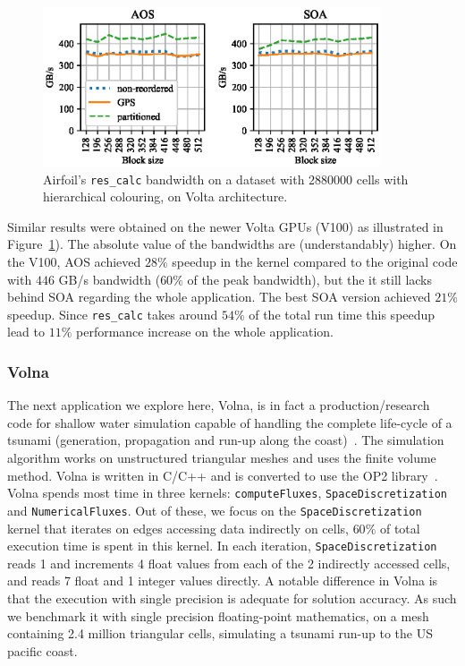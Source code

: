 \begin{figure}[Htbp]
\centering
\includegraphics[width=10cm]{fig/airfoil_bw-vs-bs_hier_large_volta.eps}
\caption{Airfoil's \texttt{res\_calc} bandwidth on a dataset with $2880000$ 
cells with hierarchical colouring, on Volta architecture.} 
\label{fig:airfoil_bw-vs-bs_hier_large_volta}
\end{figure}

Similar results were obtained on the newer Volta GPUs (V100) as illustrated in 
Figure~\ref{fig:airfoil_bw-vs-bs_hier_large_volta}). The absolute value of the
bandwidths are (understandably) higher. On the V100, AOS achieved $28\%$ 
speedup in the kernel compared to the original code with $446$ GB/s bandwidth 
($60\%$ of the peak bandwidth), but the it still lacks behind SOA regarding the
whole application. The best SOA version achieved $21\%$ speedup. Since 
\texttt{res\_calc} takes around $54\%$ of the total run time this speedup lead 
to $11\%$ performance increase on the whole application.


\subsubsection{Volna}
\noindent The next application we explore here, Volna, is in fact a 
production/research code for shallow water simulation capable of handling the 
complete life-cycle of a tsunami (generation, propagation and run-up along the 
coast)~\cite{dutykh2011volna}. The simulation algorithm works on unstructured
triangular meshes and uses the finite volume method. Volna is written in C/C++
and is converted to use the OP2 library~\cite{op2-volna2018}. Volna spends 
most time in three kernels: \texttt{computeFluxes}, \texttt{SpaceDiscretization} 
and \texttt{NumericalFluxes}. Out of these, we focus on the 
\texttt{SpaceDiscretization} kernel that iterates on edges accessing data 
indirectly on cells, $60\%$ of total execution time is spent in this kernel. In 
each iteration, \texttt{SpaceDiscretization} reads 1 and increments 4 float 
values from each of the 2 indirectly accessed cells, and reads 7 float and 1 
integer values directly. A notable difference in Volna is that the execution 
with single precision is adequate for solution accuracy. As such we benchmark it 
with single precision floating-point mathematics, on a mesh containing 2.4 
million triangular cells, simulating a tsunami run-up to the US pacific coast. 


